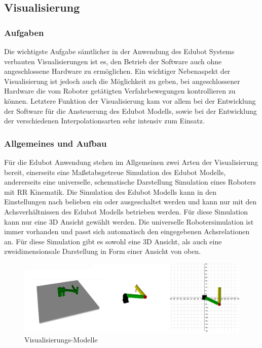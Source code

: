 \subsection{Visualisierung}

\subsubsection{Aufgaben}
Die wichtigste Aufgabe sämtlicher in der Anwendung des Edubot Systems verbauten Visualisierungen ist es, den Betrieb der Software auch ohne angeschlossene Hardware zu ermöglichen. Ein wichtiger Nebenaspekt der Visualisierung ist jedoch auch die Möglichkeit zu geben, bei angeschlossener Hardware die vom Roboter getätigten Verfahrbewegungen kontrollieren zu können.
Letztere Funktion der Visualisierung kam vor allem bei der Entwicklung der Software für die Ansteuerung des Edubot Modells, sowie bei der Entwicklung der verschiedenen Interpolationsarten sehr intensiv zum Einsatz. 

\subsubsection{Allgemeines und Aufbau}
Für die Edubot Anwendung stehen im Allgemeinen zwei Arten der Visualisierung bereit, einerseits eine Maßstabsgetreue Simulation des Edubot Modells, andererseits eine universelle, schematische Darstellung Simulation eines Roboters mit RR Kinematik. 
Die Simulation des Edubot Modells kann in den Einstellungen nach belieben ein oder ausgeschaltet werden und kann nur mit den Achsverhältnissen des Edubot Modells betrieben werden. Für diese Simulation kann nur eine 3D Ansicht gewählt werden.
Die universelle Robotersimulation ist immer vorhanden und passt sich automatisch den eingegebenen Achsrelationen an. Für diese Simulation gibt es sowohl eine 3D Ansicht, als auch eine zweidimensionsale Darstellung in Form einer Ansicht von oben.

\begin{figure}[H]
  \centering
  \begin{minipage}[t]{12 cm}
  	\centering
  	\includegraphics[width=12cm]{images/3DModels} 
    \caption{Visualisierungs-Modelle}
  \end{minipage}
\end{figure} 

